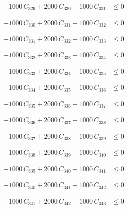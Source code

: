\documentclass[a4paper,11pt]{article}
\begin{document}
\begin{align}
-1000\,C_{329} + 2000\,C_{330} - 1000\,C_{331} &\leq 0 \nonumber
\end{align}

\begin{align}
-1000\,C_{330} + 2000\,C_{331} - 1000\,C_{332} &\leq 0 \nonumber
\end{align}

\begin{align}
-1000\,C_{331} + 2000\,C_{332} - 1000\,C_{333} &\leq 0 \nonumber
\end{align}

\begin{align}
-1000\,C_{332} + 2000\,C_{333} - 1000\,C_{334} &\leq 0 \nonumber
\end{align}

\begin{align}
-1000\,C_{333} + 2000\,C_{334} - 1000\,C_{335} &\leq 0 \nonumber
\end{align}

\begin{align}
-1000\,C_{334} + 2000\,C_{335} - 1000\,C_{336} &\leq 0 \nonumber
\end{align}

\begin{align}
-1000\,C_{335} + 2000\,C_{336} - 1000\,C_{337} &\leq 0 \nonumber
\end{align}

\begin{align}
-1000\,C_{336} + 2000\,C_{337} - 1000\,C_{338} &\leq 0 \nonumber
\end{align}

\begin{align}
-1000\,C_{337} + 2000\,C_{338} - 1000\,C_{339} &\leq 0 \nonumber
\end{align}

\begin{align}
-1000\,C_{338} + 2000\,C_{339} - 1000\,C_{340} &\leq 0 \nonumber
\end{align}

\begin{align}
-1000\,C_{339} + 2000\,C_{340} - 1000\,C_{341} &\leq 0 \nonumber
\end{align}

\begin{align}
-1000\,C_{340} + 2000\,C_{341} - 1000\,C_{342} &\leq 0 \nonumber
\end{align}

\begin{align}
-1000\,C_{341} + 2000\,C_{342} - 1000\,C_{343} &\leq 0 \nonumber
\end{align}
\end{document}
